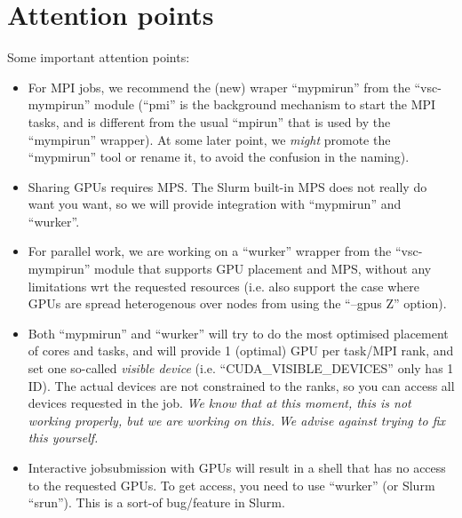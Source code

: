 



\section{Attention points}
\label{sec:gpu_ugent_attention_points}

Some important attention points:

\begin{itemize}
\item For MPI jobs, we recommend the (new) wraper ``mypmirun'' from the ``vsc-mympirun'' module
  (``pmi'' is the background mechanism to start the MPI tasks,
  and is different from the usual ``mpirun'' that is used by the ``mympirun'' wrapper).
  At some later point, we \emph{might} promote the ``mypmirun'' tool or rename it,
  to avoid the confusion in the naming).
\item Sharing GPUs requires MPS. The Slurm built-in MPS does not really do want you want, so we will provide integration with
  ``mypmirun'' and ``wurker''.
\item For parallel work, we are working on a ``wurker'' wrapper from the ``vsc-mympirun'' module that supports
  GPU placement and MPS, without any limitations wrt the requested resources (i.e. also support the case where GPUs
  are spread heterogenous over nodes from using the ``--gpus Z'' option).
\item Both ``mypmirun'' and ``wurker'' will try to do the most optimised placement of cores and tasks, and
  will provide 1 (optimal) GPU per task/MPI rank, and set one so-called \emph{visible device}
  (i.e. ``CUDA\_VISIBLE\_DEVICES'' only has 1 ID). The actual devices are not constrained to the ranks,
  so you can access all devices requested in the job.
  \emph{We know that at this moment, this is not working properly, but we are working on this. We advise against trying to fix this yourself.}
\item Interactive jobsubmission with GPUs will result in a shell that has no access to the requested GPUs. To get access, you need to use
  ``wurker'' (or Slurm ``srun''). This is a sort-of bug/feature in Slurm.
\end{itemize}

